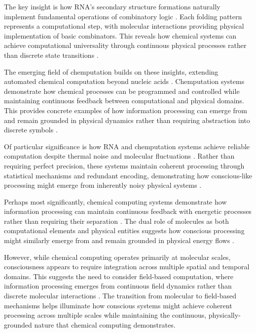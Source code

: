 The key insight is how RNA's secondary structure formations naturally implement fundamental operations of combinatory logic \cite{Qian2011,akhlaghpour2022rna}. Each folding pattern represents a computational step, with molecular interactions providing physical implementation of basic combinators. This reveals how chemical systems can achieve computational universality through continuous physical processes rather than discrete state transitions \cite{Soloveichik2010}.

The emerging field of chemputation builds on these insights, extending automated chemical computation beyond nucleic acids \cite{Szacilowski2012}. Chemputation systems demonstrate how chemical processes can be programmed and controlled while maintaining continuous feedback between computational and physical domains. This provides concrete examples of how information processing can emerge from and remain grounded in physical dynamics rather than requiring abstraction into discrete symbols \cite{Wang2021}.

Of particular significance is how RNA and chemputation systems achieve reliable computation despite thermal noise and molecular fluctuations \cite{Benenson2019}. Rather than requiring perfect precision, these systems maintain coherent processing through statistical mechanisms and redundant encoding, demonstrating how conscious-like processing might emerge from inherently noisy physical systems \cite{Katz2012}.

Perhaps most significantly, chemical computing systems demonstrate how information processing can maintain continuous feedback with energetic processes rather than requiring their separation \cite{Lehn2013}. The dual role of molecules as both computational elements and physical entities suggests how conscious processing might similarly emerge from and remain grounded in physical energy flows \cite{Magnasco1997}.

However, while chemical computing operates primarily at molecular scales, consciousness appears to require integration across multiple spatial and temporal domains. This suggests the need to consider field-based computation, where information processing emerges from continuous field dynamics rather than discrete molecular interactions \cite{Prakash2007}. The transition from molecular to field-based mechanisms helps illuminate how conscious systems might achieve coherent processing across multiple scales while maintaining the continuous, physically-grounded nature that chemical computing demonstrates.